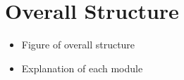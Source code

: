 \section{Overall Structure}

\begin{itemize}
  \item Figure of overall structure
  \item Explanation of each module
\end{itemize}
